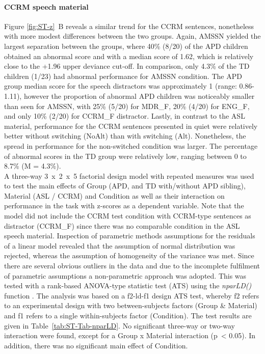 \documentclass[a4paper, twoside]{templates/ociamthesis}
\begin{document}
\hypertarget{ccrm-speech-material}{%
\paragraph*{CCRM speech material}\label{ccrm-speech-material}}

\hfill\break
Figure \ref{fig:ST-z}~B reveals a similar trend for the CCRM sentences, nonetheless with more modest differences between the two groups. Again, AMSSN yielded the largest separation between the groups, where 40\% (8/20) of the APD children obtained an abnormal score and with a median score of 1.62, which is relatively close to the +1.96 upper deviance cut-off. In comparison, only 4.3\% of the TD children (1/23) had abnormal performance for AMSSN condition. The APD group median score for the speech distractors was approximately 1 (range: 0.86-1.11), however the proportion of abnormal APD children was noticeably smaller than seen for AMSSN, with 25\% (5/20) for MDR\_F, 20\% (4/20) for ENG\_F, and only 10\% (2/20) for CCRM\_F distractor. Lastly, in contrast to the ASL material, performance for the CCRM sentences presented in quiet were relatively better without switching (NoAlt) than with switching (Alt). Nonetheless, the spread in performance for the non-switched condition was larger. The percentage of abnormal scores in the TD group were relatively low, ranging between 0 to 8.7\% (M = 4.3\%).\\

A three-way 3~x~2~x~5 factorial design model with repeated measures was used to test the main effects of Group (APD, and TD with/without APD sibling), Material (ASL / CCRM) and Condition as well as their interaction on performance in the task with z-scores as a dependent variable. Note that the model did not include the CCRM test condition with CCRM-type sentences as distractor (CCRM\_F) since there was no comparable condition in the ASL speech material. Inspection of parametric methods assumptions for the residuals of a linear model revealed that the assumption of normal distribution was rejected, whereas the assumption of homogeneity of the variance was met. Since there are several obvious outliers in the data and due to the incomplete fulfilment of parametric assumptions a non-parametric approach was adopted. This was tested with a rank-based ANOVA-type statistic test (ATS) using the \emph{nparLD()} function \autocite[nparLD package;][]{nparLDPackageR}. The analysis was based on a f2-ld-f1 design ATS test, whereby f2 refers to an experimental design with two between-subjects factors (Group \& Material) and f1 refers to a single within-subjects factor (Condition). The test results are given in Table~\ref{tab:ST-Tab-nparLD}. No significant three-way or two-way interaction were found, except for a Group x Material interaction (p~\textless{} 0.05). In addition, there was no significant main effect of Condition.\\
\end{document}
